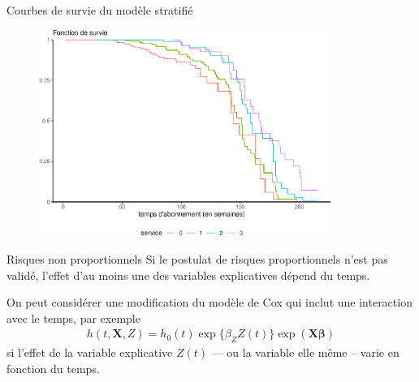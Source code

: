 \documentclass[
  ignorenonframetext,
]{beamer}
\begin{document}
\begin{frame}{Courbes de survie du modèle stratifié}
\protect\hypertarget{courbes-de-survie-du-moduxe8le-stratifiuxe9}{}
\begin{figure}

{\centering \includegraphics[width=0.85\textwidth,height=\textheight]{MATH60602-diapos10_files/figure-beamer/unnamed-chunk-6-1.pdf}

}

\end{figure}
\end{frame}

\begin{frame}{Risques non proportionnels}
\protect\hypertarget{risques-non-proportionnels}{}
Si le postulat de risques proportionnels n'est pas validé, l'effet d'au
moins une des variables explicatives dépend du temps.

On peut considérer une modification du modèle de Cox qui inclut une
interaction avec le temps, par exemple \begin{align*}
h(t,\mathbf{X}, Z) = h_0(t)\exp\{\beta_Z Z(t)\}\exp(\mathbf{X}\boldsymbol{\beta})
\end{align*} si l'effet de la variable explicative \(Z(t)\) --- ou la
variable elle même -- varie en fonction du temps.
\end{frame}
\end{document}

